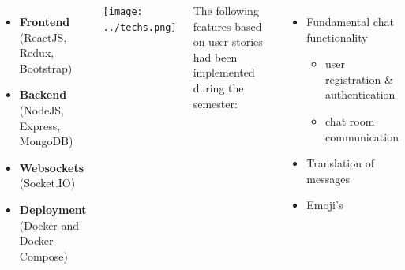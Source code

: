 \documentclass[20pt, a1paper]{tikzposter}
\begin{document}
	\begin{columns}
		{
			\begin{itemize}
				\item \textbf{Frontend} (ReactJS, Redux, Bootstrap)
				\item \textbf{Backend} (NodeJS, Express, MongoDB)
				\item \textbf{Websockets} (Socket.IO)
				\item \textbf{Deployment} (Docker and Docker-Compose)
			\end{itemize}
		
			\begin{tikzfigure}
			\texttt{[image: ../techs.png]}
			\end{tikzfigure}
		}
	
		
		{
			The following features based on user stories had been implemented during the semester:
			\begin{itemize}
				\item Fundamental chat functionality
				\begin{itemize}
					\item user registration \& authentication
					\item chat room communication
				\end{itemize}
				\item Translation of messages
				\item Emoji's 
			\end{itemize}
		
}
\end{columns}
\end{document}
